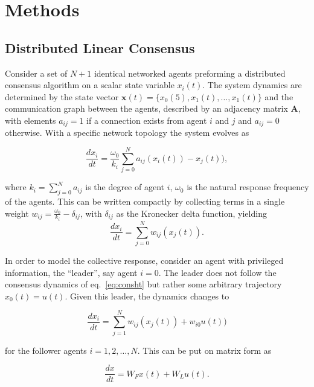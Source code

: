 \documentclass[fleqn,10pt]{wlscirep}
\begin{document}
\section*{Methods}\label{sec:Methods}

\subsection*{Distributed Linear Consensus}
\label{sec:dlc}

Consider a set of $N + 1$ identical networked agents preforming a distributed consensus algorithm on a scalar state variable $x_i(t)$. The system dynamics are determined by the state vector $\mathbf{x}(t) = \{x_{0}(5),x_{1}(t),\ldots,x_{1}(t) \}$ and the communication graph between the agents, described by an adjacency matrix $\mathbf{A}$, with elements $a_{ij} = 1$ if a connection exists from agent $i$ and $j$ and $a_{ij} = 0$ otherwise. With a specific network topology the system evolves as

\begin{equation}
  \label{eq:lincon}
  \frac{dx_i}{dt} = \frac{\omega_0}{k_i} \sum^{N}_{j = 0} a_{ij} (x_i(t)) - x_j(t)),
\end{equation}

where $k_i = \sum_{j=0}^N a_{ij}$ is the degree of agent $i$, $\omega_0$ is the natural response frequency of the agents. This can be written compactly by collecting terms in a single weight $w_{ij} = \frac{\omega_0}{k_i} - \delta_{ij}$, with $\delta_{ij}$ as the Kronecker delta function, yielding
\begin{equation}
  \label{eq:consht}
  \frac{dx_i}{dt} = \sum^{N}_{j = 0} w_{ij} (x_j(t)).
\end{equation}

In order to model the collective response, consider an agent with privileged information, the ``leader'', say agent $i=0$. The leader does not follow the consensus dynamics of eq.~\ref{eq:consht} but rather some  arbitrary trajectory $x_0(t) = u(t)$. Given this leader, the dynamics changes to

\begin{equation}
  \label{eq:dynamic}
  \frac{dx_i}{dt} = \sum^{N}_{j = 1} w_{ij} (x_j(t)) + w_{i0}u(t))
\end{equation}

for the follower agents $i=1,2, \dots, N$. This can be put on matrix form as

\begin{equation}
  \label{eq:dynmat}
  \frac{dx}{dt} = W_Fx(t)  + W_Lu(t).
\end{equation}
\end{document}
